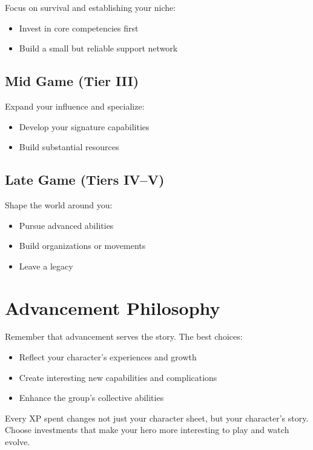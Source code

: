 \documentclass[11pt,twoside,openany]{book}
\begin{document}
Focus on survival and establishing your niche:
\begin{itemize}
\item Invest in core competencies first
\item Build a small but reliable support network
\end{itemize}

\subsection*{Mid Game (Tier III)}

Expand your influence and specialize:
\begin{itemize}
\item Develop your signature capabilities
\item Build substantial resources
\end{itemize}

\subsection*{Late Game (Tiers IV--V)}

Shape the world around you:
\begin{itemize}
\item Pursue advanced abilities
\item Build organizations or movements
\item Leave a legacy
\end{itemize}

\section*{Advancement Philosophy} 

Remember that advancement serves the story. The best choices:
\begin{itemize}
\item Reflect your character's experiences and growth
\item Create interesting new capabilities and complications
\item Enhance the group's collective abilities
\end{itemize}

\begin{tcolorbox}[colback=gray!5!white, colframe=gray!75!black, title=Final Thought, fonttitle=\bfseries,breakable]
Every XP spent changes not just your character sheet, but your character's story. Choose investments that make your hero more interesting to play and watch evolve.
\end{tcolorbox}
\end{document}
